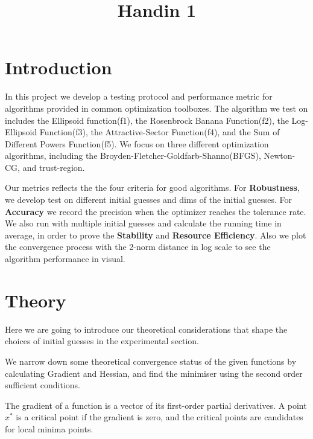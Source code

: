 \documentclass[12pt]{article}
\title{Handin 1}
\begin{document}
\maketitle

\section{Introduction}

In this project we develop a testing protocol and performance metric for algorithms provided in common optimization toolboxes. The algorithm we test on includes the Ellipsoid function(f1), the Rosenbrock Banana Function(f2), the Log-Ellipsoid Function(f3), the Attractive-Sector Function(f4), and the Sum of Different Powers Function(f5). We focus on three different optimization algorithms, including the Broyden-Fletcher-Goldfarb-Shanno(BFGS), Newton-CG, and trust-region.

Our metrics reflects the the four criteria for good algorithms. For \textbf{Robustness}, we develop test on different initial guesses and dims of the initial guesses. For \textbf{Accuracy} we record the precision when the optimizer reaches the tolerance rate. We also run with multiple initial guesses and calculate the running time in average, in order to prove the \textbf{Stability} and \textbf{Resource Efficiency}. %
Also we plot the convergence process with the 2-norm distance in log scale to see the algorithm performance in visual. 


\section{Theory}

Here we are going to introduce our theoretical considerations that shape the choices of initial guesses in the experimental section.

We narrow down some theoretical convergence status of the given functions by calculating Gradient and Hessian, and find the minimiser using the second order sufficient conditions.

The gradient of a function is a vector of its first-order partial derivatives. A point $x^*$ is a critical point if the gradient is zero, and the critical points are candidates for local minima points.
\end{document}
